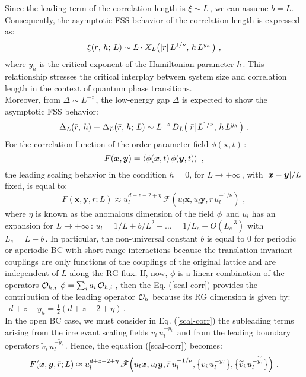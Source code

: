 Since the leading term of the correlation length is $\xi \sim L\,$, we can assume $b=L$. Consequently, the asymptotic FSS behavior of the correlation length is expressed as:
\begin{equation}
\label{xifsscqt1}
\xi(\bar r, \, h ;\,L) \sim
L \cdot X_L\bigl( 
\abs*{\bar r}\,L^{1/\nu} ,\,h\,L^{y_h} \,    \bigl) \,\, ,
\end{equation}
where $y_h$ is the critical exponent of the Hamiltonian parameter $h\,$. This relationship stresses the critical interplay between system size and correlation length in the context of quantum phase transitions.\\
Moreover, from $\Delta \sim L^{-z}\,$, the low-energy gap $\Delta$ is expected to show the asymptotic FSS behavior:
\begin{equation}
\label{deltafsscqt}
\Delta _L(\bar r, \, h) \equiv \Delta _L(\bar r, \, h;\,L) \sim
L^{-z} \, D_L\bigl( 
\abs*{\bar r}\,L^{1/\nu} ,\,h\,L^{y_h} \,    \bigl) \,\, .
\end{equation}
$ $\\
For the correlation function of the order-parameter field $\phi(\bm x, t)\,$:
\begin{equation}
\label{corr-ord}
F(\bm x, \bm y) = \braket{\phi(\bm x,t)\,\phi(\bm y,t)}
\,\, ,
\end{equation}
the leading scaling behavior in the condition $h=0$, for $L\to +\infty\,$, with $\abs*{\bm x- \bm y}/L$ fixed,  is equal to:
\begin{equation}
\label{scal-corr}
F(\bm x, \bm y, \bar r;L) \approx u_l^{d+z-2+\eta} \, \mathscr{F}(u_l\bm x ,u_l\bm y, \bar r\,u_l^{-1/\nu})
\,\, ,
\end{equation}
where $\eta$ is known as the anomalous dimension of the field $\phi\,$ and $u_l$ has an expansion for $L\to +\infty\,$: $u_l = 1/L + b/L^2 + \dots = 1/L_e + O(L_e^{-3})$ with $L_e = L-b\,$. In particular, the non-universal constant $b$ is equal to $0$ for periodic or aperiodic BC with short-range interactions because the translation-invariant couplings are only functions of the couplings of the original lattice and are independent of $L$ along the RG flux. If, now, $\phi$ is a linear combination of the operators ${\cal O}_{h,i}$ $\phi = \sum _i a_i\,{\cal O}_{h,i}\,$, 
then the Eq. (\ref{scal-corr}) provides the contribution of the leading operator ${\cal O}_h$ because its RG dimension is given by: $\,\,\, d + z - y_h = \frac{1}{2}\left(d+z-2+\eta\right)\,$.\\
In the open BC case, we must consider in Eq. (\ref{scal-corr}) the subleading terms arising from the irrelevant scaling fields $v_i\,u_l^{-y_i}\,$ and from the leading boundary operators $\widetilde{v}_i\,u_l^{-\widetilde{y}_i}\,$. Hence, the equation (\ref{scal-corr}) becomes:
\begin{equation}%
\label{scal-corr1}
F(\bm x, \bm y, \bar r;L) \approx u_l^{d+z-2+\eta} \,\mathscr{F}\Bigl(u_l\bm x ,u_l\bm y, \bar r\,u_l^{-1/\nu}, \bigl\{v_i\,u_l^{-y_i}\bigl\},  \bigl\{\widetilde{v}_i\,u_l^{-\widetilde{y}_i}\bigl\}  \Bigl)
\,\, .
\end{equation}


